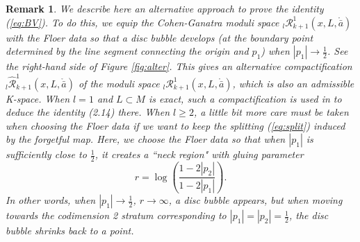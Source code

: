 \documentclass[a4paper]{article}
\newtheorem{remark}[theorem]{Remark}
\numberwithin{equation}{section}
\begin{document}
\begin{remark}
We describe here an alternative approach to prove the identity (\ref{eq:BV}). To do this, we equip the Cohen-Ganatra moduli space ${}_l\mathcal{R}_{k+1}^1(x,L,\ring{\bar{a}})$ with the Floer data so that a disc bubble develops (at the boundary point determined by the line segment connecting the origin and $p_1$) when $|p_1|\rightarrow\frac{1}{2}$. See the right-hand side of Figure \ref{fig:alter}. This gives an alternative compactification ${}_l\widehat{\mathcal{R}}_{k+1}^1(x,L,\ring{\bar{a}})$ of the moduli space ${}_l\mathcal{R}_{k+1}^1(x,L,\ring{\bar{a}})$, which is also an admissible K-space. When $l=1$ and $L\subset M$ is exact, such a compactification is used in \cite{ss} to deduce the identity (2.14) there. When $l\geq2$, a little bit more care must be taken when choosing the Floer data if we want to keep the splitting (\ref{eq:split}) induced by the forgetful map. Here, we choose the Floer data so that when $|p_1|$ is sufficiently close to $\frac{1}{2}$, it creates a ``neck region" with gluing parameter
\begin{equation}
r=\log\left(\frac{1-2|p_2|}{1-2|p_1|}\right).
\end{equation}
In other words, when $|p_1|\rightarrow\frac{1}{2}$, $r\rightarrow\infty$, a disc bubble appears, but when moving towards the codimension 2 stratum corresponding to $|p_1|=|p_2|=\frac{1}{2}$, the disc bubble shrinks back to a point.

\begin{figure}
	\centering
\end{figure}
\end{remark}
\end{document}
